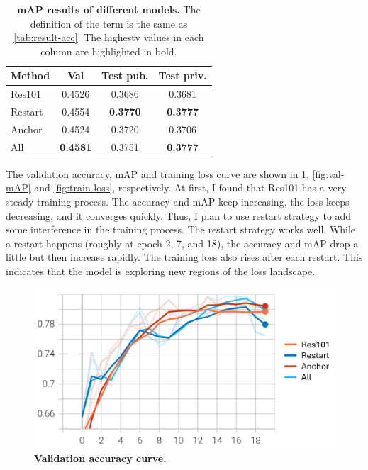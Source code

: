 \documentclass[10pt,twocolumn,letterpaper]{article}
\begin{document}
\begin{table}[h]
  \centering
  \begin{tabular}{lccc}
    \toprule
    \multicolumn{1}{c}{\textbf{Method}} & \textbf{Val}    & \textbf{Test pub.} & \textbf{Test priv.} \\
    \midrule
    Res101                              & 0.4526          & 0.3686             & 0.3681              \\
    Restart                             & 0.4554          & \textbf{0.3770}    & \textbf{0.3777}     \\
    Anchor                              & 0.4524          & 0.3720             & 0.3706              \\
    All                                 & \textbf{0.4581} & 0.3751             & \textbf{0.3777}     \\
    \bottomrule
  \end{tabular}
  \caption{\textbf{mAP results of different models.} The definition of the
    term is the same as \cref{tab:result-acc}. The highestv values in each
    column are highlighted in bold.
  }
  \label{tab:result-map}
\end{table}

The validation accuracy, mAP and training loss curve are shown in \cref{fig:val-acc},
\cref{fig:val-mAP} and \cref{fig:train-loss}, respectively. At first, I found that Res101 has a
very steady training process. The accuracy and mAP keep increasing, the loss keeps
decreasing, and it converges quickly. Thus, I plan to use restart strategy to add
some interference in the training process. The restart strategy works well. While
a restart happens (roughly at epoch 2, 7, and 18), the accuracy and mAP drop a little
but then increase rapidly. The training loss also rises after each restart. This indicates
that the model is exploring new regions of the loss landscape.

\begin{figure}[h]
  \centering
  \includegraphics[width=0.9\linewidth]{assets/val_acc.png}
  \caption{\textbf{Validation accuracy curve.}}
  \label{fig:val-acc}
\end{figure}
\end{document}
